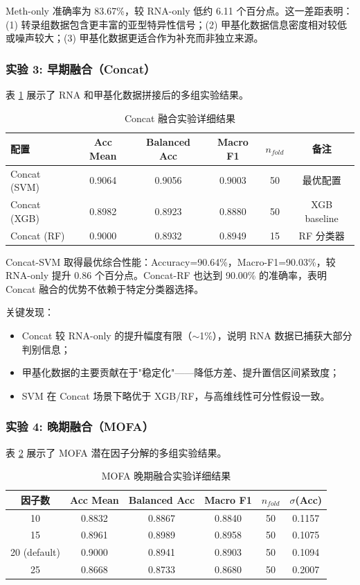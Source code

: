 Meth-only 准确率为 83.67\%，较 RNA-only 低约 6.11 个百分点。这一差距表明：(1) 转录组数据包含更丰富的亚型特异性信号；(2) 甲基化数据信息密度相对较低或噪声较大；(3) 甲基化数据更适合作为补充而非独立来源。

\subsubsection{实验 3: 早期融合（Concat）}

表 \ref{tab:concat_results} 展示了 RNA 和甲基化数据拼接后的多组实验结果。

\begin{table}[htbp]
\centering
\caption{Concat 融合实验详细结果}
\label{tab:concat_results}
\begin{tabular}{|l|ccccc|}
\hline
\textbf{配置} & \textbf{Acc Mean} & \textbf{Balanced Acc} & \textbf{Macro F1} & $n_{fold}$ & \textbf{备注} \\
\hline
Concat (SVM) & 0.9064 & 0.9056 & 0.9003 & 50 & 最优配置 \\
Concat (XGB) & 0.8982 & 0.8923 & 0.8880 & 50 & XGB baseline \\
Concat (RF) & 0.9000 & 0.8932 & 0.8949 & 15 & RF 分类器 \\
\hline
\end{tabular}
\end{table}

Concat-SVM 取得最优综合性能：Accuracy=90.64\%，Macro-F1=90.03\%，较 RNA-only 提升 0.86 个百分点。Concat-RF 也达到 90.00\% 的准确率，表明 Concat 融合的优势不依赖于特定分类器选择。

关键发现：
\begin{itemize}
    \item Concat 较 RNA-only 的提升幅度有限（$\sim$1\%），说明 RNA 数据已捕获大部分判别信息；
    \item 甲基化数据的主要贡献在于"稳定化"——降低方差、提升置信区间紧致度；
    \item SVM 在 Concat 场景下略优于 XGB/RF，与高维线性可分性假设一致。
\end{itemize}

\subsubsection{实验 4: 晚期融合（MOFA）}

表 \ref{tab:mofa_results} 展示了 MOFA 潜在因子分解的多组实验结果。

\begin{table}[htbp]
\centering
\caption{MOFA 晚期融合实验详细结果}
\label{tab:mofa_results}
\begin{tabular}{|cccccc|}
\hline
\textbf{因子数} & \textbf{Acc Mean} & \textbf{Balanced Acc} & \textbf{Macro F1} & $n_{fold}$ & $\sigma$(Acc) \\
\hline
10 & 0.8832 & 0.8867 & 0.8840 & 50 & 0.1157 \\
15 & 0.8961 & 0.8989 & 0.8958 & 50 & 0.1075 \\
20 (default) & 0.9000 & 0.8941 & 0.8903 & 50 & 0.1094 \\
25 & 0.8668 & 0.8733 & 0.8680 & 50 & 0.2007 \\
\hline
\end{tabular}
\end{table}

